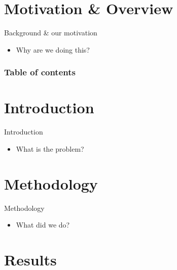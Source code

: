 \documentclass[compress]{beamer}
\title{\presentationtitle}
\subtitle{\presentationsubtitle}
\date{\presentationdate}
\author{\presentingauthor}
\institute{\labname}
\begin{document}
\maketitle

\section*{Motivation \& Overview}
	
	\begin{frame}{Background \& our motivation}
	\begin{itemize}
		\item Why are we doing this? \cite{example}
	\end{itemize}
	\end{frame}
	
	\begin{frame}
		\frametitle{Table of contents}
		\tableofcontents
	\end{frame}

\section{Introduction}
	
	\begin{frame}{Introduction}
	\begin{itemize}
		\item What is the problem?
	\end{itemize}
	\end{frame}

\section{Methodology}

	\begin{frame}{Methodology}
	\begin{itemize}
		\item What did we do?
	\end{itemize}
	\end{frame}
	
\section{Results}
\end{document}
